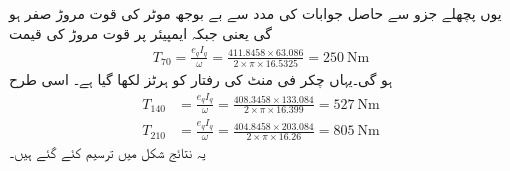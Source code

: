 \begin{itemize}
یوں پچھلے جزو سے حاصل جوابات کی مدد سے بے بوجھ موٹر کی قوت مروڑ  صفر ہو گی یعنی   جبکہ   ایمپیئر پر قوت مروڑ کی قیمت
\begin{align*}
T_{70}=\frac{e_q I_q}{\omega}=\frac{411.8458 \times 63.086}{2 \times \pi \times 16.5325}=\SI{250}{\newton \meter}
\end{align*}
ہو گی۔یہاں  چکر فی منٹ کی رفتار کو  ہرٹز لکھا گیا ہے۔ اسی طرح
\begin{align*}
T_{140}&=\frac{e_q I_q}{\omega}=\frac{408.3458 \times 133.084}{2 \times \pi \times 16.399}=\SI{527}{\newton \meter}\\
T_{210}&=\frac{e_q I_q}{\omega}=\frac{404.8458 \times  203.084}{2 \times \pi \times 16.26}=\SI{805}{\newton \meter}
\end{align*}
یہ نتائج شکل   میں ترسیم کئے گئے ہیں۔
\end{itemize}

